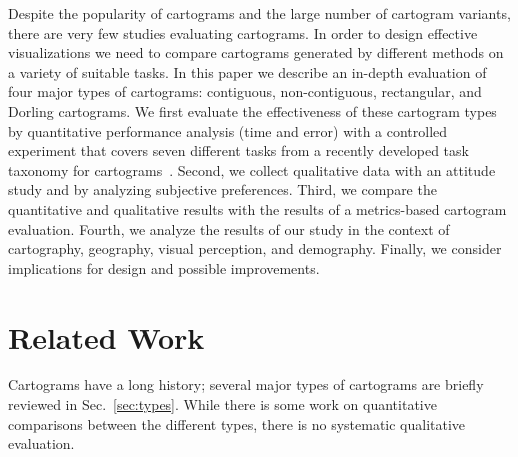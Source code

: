\documentclass[10pt,journal,compsoc]{IEEEtran}
\begin{document}
Despite the popularity of cartograms and the large number of cartogram variants, there are very few studies evaluating  cartograms. In order to design effective visualizations we need to compare cartograms generated by different methods on a variety of suitable tasks. 
In this paper we describe an in-depth evaluation of four major types of cartograms: contiguous, non-contiguous, rectangular, and Dorling cartograms. We first evaluate the effectiveness of these cartogram types by quantitative performance analysis (time and error) with a controlled experiment that covers seven different tasks from a recently developed task taxonomy for cartograms~\cite{Task_C}. 
Second, we collect qualitative data with an attitude study and by analyzing subjective preferences.
Third, we compare the quantitative and qualitative results with the results of a metrics-based cartogram evaluation. Fourth, we analyze the results of our study in the context of cartography, geography, visual perception, and demography. Finally, we consider implications for design and possible improvements.





\section{Related Work}



Cartograms have a  long history; several major types of cartograms are briefly reviewed  in Sec.~\ref{sec:types}.
While there is some work on quantitative comparisons between the different types, there is no systematic qualitative evaluation. 
\end{document}

